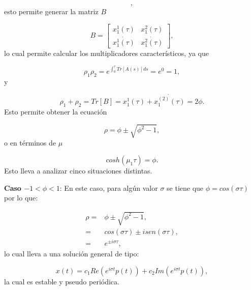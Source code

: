 \documentclass[10pt,a4paper]{report}
\begin{document}
\begin{equation}
[\begin{array}{c}
x_1^2(t) \\
\dot{x_1^2(t)}
\end{array}],
\end{equation} esto permite generar la matriz $B$

\begin{equation}
B= [\begin{array}{cc}

x_1^1(\tau) & x_1^2(\tau) \\
\dot{x_1^1(\tau)} & \dot{x_1^2(\tau)}

\end{array}],
\end{equation} lo cual permite calcular los multiplicadores característicos, ya que

\begin{equation}
\rho_1 \rho_2 = e^{\int_0^\tau Tr[A(s)]ds} = e^0 = 1,
\end{equation} y

\begin{equation}
\rho_1 + \rho_2 = Tr[B] =x_1^1(\tau)+ \dot{x_1^{(2)}(\tau)} = 2\phi.
\end{equation} Esto permite obtener la ecuación

\begin{equation}
\rho = \phi \pm \sqrt{\phi^2 -1},
\end{equation} o en términos de $\mu$

\begin{equation}
cosh(\mu_1 \tau) = \phi.
\end{equation} Esto lleva a analizar cinco situaciones distintas.

\textbf{Caso $ -1 < \phi < 1$}: En este caso, para algún valor $\sigma$ se tiene que $\phi = cos(\sigma \tau)$ por lo que:

\begin{align*}
\rho =& \phi \pm \sqrt{\phi^2 -1},\\
=& cos(\sigma \tau) \pm isen(\sigma \tau), \\
=& e^{\pm i\sigma \tau},
\end{align*} lo cual lleva a una solución general de tipo:

\begin{equation}
x(t) = c_1 Re(e^{i\sigma t} p(t)) + c_2 Im(e^{i\sigma t} p(t)),
\end{equation} la cual es estable y pseudo periódica.
\end{document}

